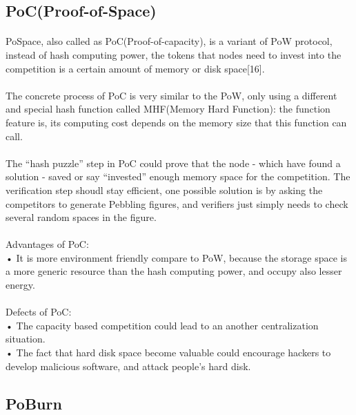 \documentclass[doublespacing]{bmcart}
\begin{document}
\begin{CJK*}{UTF8}{gbsn}
\subsection{PoC(Proof-of-Space)}
	\paragraph{} 
	PoSpace, also called as PoC(Proof-of-capacity), is a variant of PoW protocol, instead of hash computing power, the tokens that nodes need to invest into the competition is a certain amount of memory or disk space[16].
	\paragraph{} 
	The concrete process of PoC is very similar to the PoW, only using a different and special hash function called MHF(Memory Hard Function): the function feature is, its computing cost depends on the memory size that this function can call.
	\paragraph{} 
	The ``hash puzzle'' step in PoC could prove that the node - which have found a solution - saved or say ``invested'' enough memory space for the competition. The verification step shoudl stay efficient, one possible solution is by asking the competitors to generate Pebbling figures, and verifiers just simply needs to check several random spaces in the figure. 
	\paragraph{} 
Advantages of PoC:
\\• It is more environment friendly compare to PoW, because the storage space is a more generic resource than the hash computing power, and occupy also lesser energy. 
	\paragraph{} 
Defects of PoC:
\\• The capacity based competition could lead to an another centralization situation.
\\• The fact that hard disk space become valuable could encourage hackers to develop malicious software, and attack people's hard disk.  

\subsection{PoBurn}

\end{CJK*}
\end{document}
